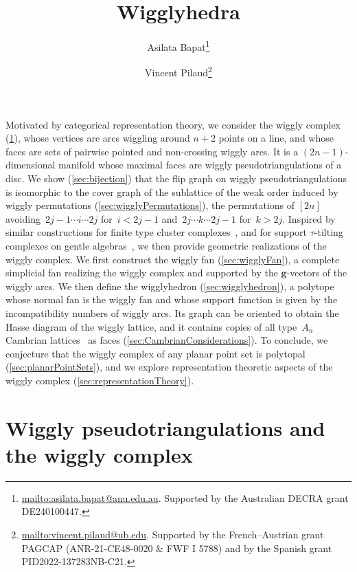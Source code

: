 \documentclass[submission]{FPSAC2025}
\title{Wigglyhedra}
\author{Asilata Bapat\thanks{\href{mailto:asilata.bapat@anu.edu.au}{mailto:asilata.bapat@anu.edu.au}. Supported by the Australian DECRA grant DE240100447.}\addressmark{1} \and Vincent Pilaud\thanks{\href{mailto:vincent.pilaud@ub.edu}{mailto:vincent.pilaud@ub.edu}. Supported by the French--Austrian grant PAGCAP (ANR-21-CE48-0020 \& FWF I 5788) and by the Spanish grant PID2022-137283NB-C21.}\addressmark{2}}
\theoremstyle{definition}
\renewcommand{\b}[1]{{\boldsymbol{#1}}} %
\begin{document}

\maketitle

Motivated by categorical representation theory, we consider the wiggly complex (\cref{sec:wigglyPseudotriangulations}), whose vertices are arcs wiggling around $n+2$ points on a line, and whose faces are sets of pairwise pointed and non-crossing wiggly arcs.
It is a $(2n-1)$-dimensional manifold whose maximal faces are wiggly pseudotriangulations of a disc.
We show (\cref{sec:bijection}) that the flip graph on wiggly pseudotriangulations is isomorphic to the cover graph of the sublattice of the weak order induced by wiggly permutations (\cref{sec:wigglyPermutations}), the permutations of $[2n]$ avoiding~$2j-1 \cdots i \cdots 2j$ for~$i < 2j-1$ and~$2j \cdots k \cdots 2j-1$ for~$k > 2j$.
Inspired by similar constructions for finite type cluster complexes~\cite{HohlwegLangeThomas,HohlwegPilaudStella}, and for support $\tau$-tilting complexes on gentle algebras~\cite{PaluPilaudPlamondon-nonkissing}, we then provide geometric realizations of the wiggly complex.
We first construct the wiggly fan (\cref{sec:wigglyFan}), a complete simplicial fan realizing the wiggly complex and supported by the $\b{g}$-vectors of the wiggly arcs.
We then define the wigglyhedron (\cref{sec:wigglyhedron}), a polytope whose normal fan is the wiggly fan and whose support function is given by the incompatibility numbers of wiggly arcs.
Its graph can be oriented to obtain the Hasse diagram of the wiggly lattice, and it contains copies of all type~$A_n$ Cambrian lattices~\cite{Reading-CambrianLattices} as faces (\cref{sec:CambrianConsiderations}).
To conclude, we conjecture that the wiggly complex of any planar point set is polytopal (\cref{sec:planarPointSets}), and we explore representation theoretic aspects of the wiggly complex (\cref{sec:representationTheory}).

\newpage
\section{Wiggly pseudotriangulations and the wiggly complex}
\label{sec:wigglyPseudotriangulations}
\end{document}
